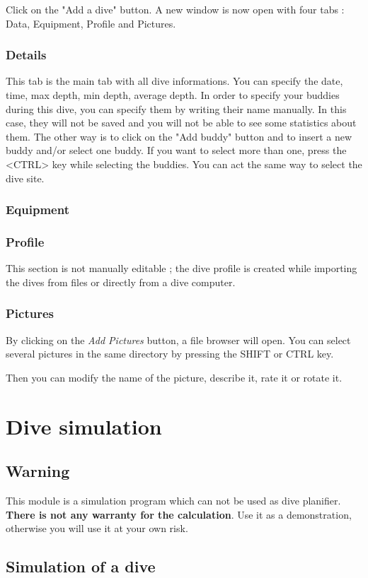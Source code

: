 \documentclass[10pt,a4paper,titlepage]{report}
\begin{document}
Click on the "Add a dive" button. A new window is now open with four tabs : Data, Equipment, Profile and Pictures.\subsection{Details}
This tab is the main tab with all dive informations. You can specify the date, time, max depth, min depth, average depth. In order to specify your buddies during this dive, you can specify them by writing their name manually. In this case, they will not be saved and you will not be able to see some statistics about them. 
The other way is to click on the "Add buddy" button and to insert a new buddy and/or select one buddy. If you want to select more than one, press the <CTRL> key while selecting the buddies.
You can act the same way to select the dive site.\subsection{Equipment}
\subsection{Profile}
This section is not manually editable ; the dive profile is created while importing the dives from files or directly from a dive computer.
\subsection{Pictures}
By clicking on the \textit{Add Pictures} button, a file browser will open.
You can select several pictures in the same directory by pressing the SHIFT or CTRL key.

Then you can modify the name of the picture, describe it, rate it  or rotate it. 
\chapter{Dive simulation}
\section{Warning}
This module is a simulation program which can not be used as dive planifier. \textbf{There is not any warranty for the calculation}. Use it as a demonstration, otherwise you will use it at your own risk.
\section{Simulation of a dive}
\end{document}
